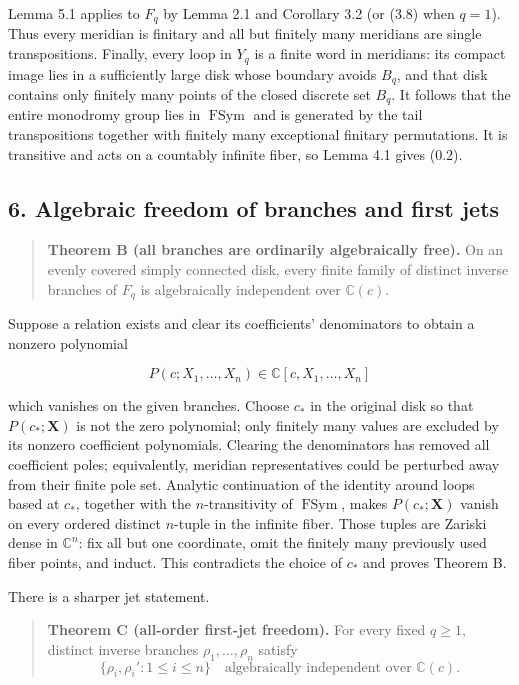 \documentclass[11pt]{article}
\theoremstyle{keio}
\theoremstyle{definition}
\theoremstyle{remark}
\begin{document}
Lemma 5.1 applies to \(F_q\) by Lemma 2.1 and Corollary 3.2 (or (3.8) when
\(q=1\)). Thus every meridian is finitary and all but finitely many
meridians are single transpositions. Finally, every loop in \(Y_q\) is a
finite word in meridians: its compact image lies in a sufficiently large
disk whose boundary avoids \(B_q\), and that disk contains only finitely
many points of the closed discrete set \(B_q\). It follows that the entire
monodromy group lies in \(\operatorname{FSym}\) and is generated by the
tail transpositions together with finitely many exceptional finitary
permutations. It is transitive and acts on a countably infinite fiber, so
Lemma 4.1 gives (0.2).

\subsection{6. Algebraic freedom of branches and first jets}

\begin{quote}
\textbf{Theorem B (all branches are ordinarily algebraically free).} On an
evenly covered simply connected disk, every finite family of distinct
inverse branches of \(F_q\) is algebraically independent over
\(\mathbb C(c)\).
\end{quote}

Suppose a relation exists and clear its coefficients' denominators to obtain
a nonzero polynomial

\[
 P(c;X_1,\ldots,X_n)\in\mathbb C[c,X_1,\ldots,X_n]
\]

which vanishes on the given branches. Choose \(c_*\) in the original disk
so that \(P(c_*;\mathbf X)\) is not the zero polynomial; only finitely many
values are excluded by its nonzero coefficient polynomials. Clearing the
denominators has removed all coefficient poles; equivalently, meridian
representatives could be perturbed away from their finite pole set. Analytic
continuation of the identity around loops based at \(c_*\), together with
the \(n\)-transitivity of \(\operatorname{FSym}\), makes
\(P(c_*;\mathbf X)\) vanish on every ordered distinct \(n\)-tuple in the
infinite fiber. Those tuples are Zariski dense in \(\mathbb C^n\): fix all
but one coordinate, omit the finitely many previously used fiber points, and
induct. This contradicts the choice of \(c_*\) and proves Theorem B.

There is a sharper jet statement.

\begin{quote}
\textbf{Theorem C (all-order first-jet freedom).} For every fixed \(q\geq1\),
distinct inverse branches \(\rho_1,\ldots,\rho_n\) satisfy
\[
 \{\rho_i,\rho_i':1\leq i\leq n\}
 \quad\text{algebraically independent over }\mathbb C(c).
\tag{Inv-6.1}
\]
\end{quote}
\end{document}
